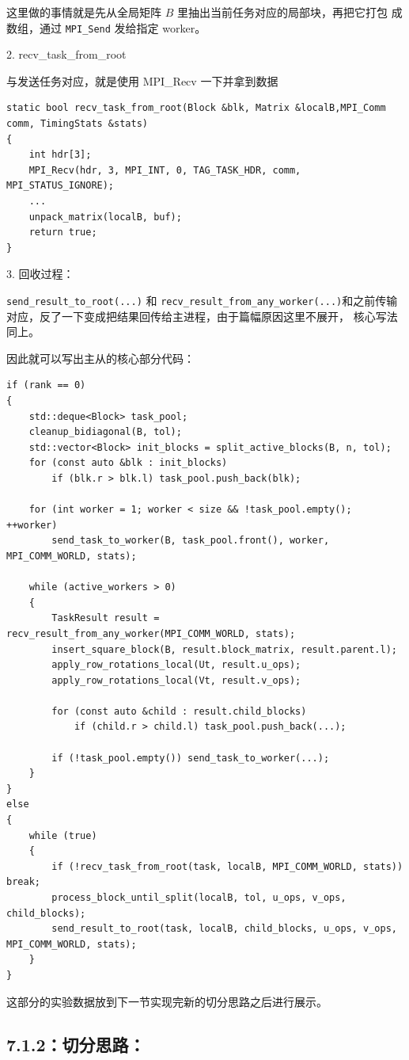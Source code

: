 \documentclass[12pt,a4paper,fontset=none]{ctexart}
\begin{document}
这里做的事情就是先从全局矩阵 \(B\) 里抽出当前任务对应的局部块，再把它打包
成数组，通过 \texttt{MPI\_Send} 发给指定 worker。

2. recv\_task\_from\_root

与发送任务对应，就是使用 MPI\_Recv 一下并拿到数据

\begin{lstlisting}
static bool recv_task_from_root(Block &blk, Matrix &localB,MPI_Comm comm, TimingStats &stats)
{
    int hdr[3];
    MPI_Recv(hdr, 3, MPI_INT, 0, TAG_TASK_HDR, comm, MPI_STATUS_IGNORE);
    ...
    unpack_matrix(localB, buf);
    return true;
}
\end{lstlisting}
3. 回收过程：

\texttt{send\_result\_to\_root(...)} 和 \texttt{recv\_result\_from\_any\_worker(...)}和之前传输对应，反了一下变成把结果回传给主进程，由于篇幅原因这里不展开， 核心写法同上。

因此就可以写出主从的核心部分代码：

\begin{lstlisting}
if (rank == 0)
{
    std::deque<Block> task_pool;
    cleanup_bidiagonal(B, tol);
    std::vector<Block> init_blocks = split_active_blocks(B, n, tol);
    for (const auto &blk : init_blocks)
        if (blk.r > blk.l) task_pool.push_back(blk);

    for (int worker = 1; worker < size && !task_pool.empty(); ++worker)
        send_task_to_worker(B, task_pool.front(), worker, MPI_COMM_WORLD, stats);

    while (active_workers > 0)
    {
        TaskResult result = recv_result_from_any_worker(MPI_COMM_WORLD, stats);
        insert_square_block(B, result.block_matrix, result.parent.l);
        apply_row_rotations_local(Ut, result.u_ops);
        apply_row_rotations_local(Vt, result.v_ops);

        for (const auto &child : result.child_blocks)
            if (child.r > child.l) task_pool.push_back(...);

        if (!task_pool.empty()) send_task_to_worker(...);
    }
}
else
{
    while (true)
    {
        if (!recv_task_from_root(task, localB, MPI_COMM_WORLD, stats)) break;
        process_block_until_split(localB, tol, u_ops, v_ops, child_blocks);
        send_result_to_root(task, localB, child_blocks, u_ops, v_ops, MPI_COMM_WORLD, stats);
    }
}
\end{lstlisting}
这部分的实验数据放到下一节实现完新的切分思路之后进行展示。
\subsection{7.1.2：切分思路：}
\end{document}
